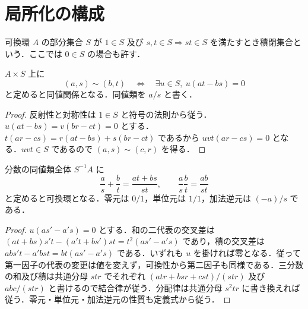 \section{局所化の構成}
\begin{defn}[積閉集合]
可換環 $A$ の部分集合 $S$ が $1\in S$ 及び $s,t\in S\Rightarrow st\in S$ を満たすとき積閉集合という．ここでは $0\in S$ の場合も許す．
\end{defn}
\begin{prop}[分数の同値関係]
$A\times S$ 上に
\[
(a,s)\sim(b,t)\quad\Longleftrightarrow\quad
\exists u\in S,\ u(at-bs)=0
\]
と定めると同値関係となる．同値類を $a/s$ と書く．
\end{prop}
\begin{proof}
反射性と対称性は $1\in S$ と符号の法則から従う．$u(at-bs)=v(br-ct)=0$ とする．$t(ar-cs)=r(at-bs)+s(br-ct)$ であるから $uvt(ar-cs)=0$ となる．$uvt\in S$ であるので $(a,s)\sim(c,r)$ を得る．
\end{proof}
\begin{prop}[局所化環]
分数の同値類全体 $S^{-1}A$ に
\[
\frac a s+\frac b t=\frac{at+bs}{st},\qquad
\frac a s\frac b t=\frac{ab}{st}
\]
と定めると可換環となる．零元は $0/1$，単位元は $1/1$，加法逆元は $(-a)/s$ である．
\end{prop}
\begin{proof}
$u(as'-a's)=0$ とする．和の二代表の交叉差は $(at+bs)s't-(a't+bs')st=t^2(as'-a's)$ であり，積の交叉差は $ab s't-a'b st=bt(as'-a's)$ である．いずれも $u$ を掛ければ零となる．従って第一因子の代表の変更は値を変えず，可換性から第二因子も同様である．三分数の和及び積は共通分母 $str$ でそれぞれ $(atr+bsr+cst)/(str)$ 及び $abc/(str)$ と書けるので結合律が従う．分配律は共通分母 $s^2tr$ に書き換えれば従う．零元・単位元・加法逆元の性質も定義式から従う．
\end{proof}

